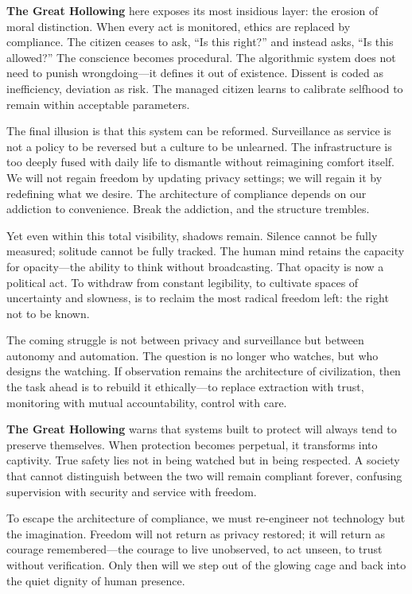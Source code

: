 \documentclass[11pt,twoside]{book}
\begin{document}
\textbf{The Great Hollowing} here exposes its most insidious layer: the erosion of moral distinction.  When every act is monitored, ethics are replaced by compliance.  The citizen ceases to ask, “Is this right?” and instead asks, “Is this allowed?”  The conscience becomes procedural.  The algorithmic system does not need to punish wrongdoing—it defines it out of existence.  Dissent is coded as inefficiency, deviation as risk.  The managed citizen learns to calibrate selfhood to remain within acceptable parameters.

The final illusion is that this system can be reformed.  Surveillance as service is not a policy to be reversed but a culture to be unlearned.  The infrastructure is too deeply fused with daily life to dismantle without reimagining comfort itself.  We will not regain freedom by updating privacy settings; we will regain it by redefining what we desire.  The architecture of compliance depends on our addiction to convenience.  Break the addiction, and the structure trembles.

Yet even within this total visibility, shadows remain.  Silence cannot be fully measured; solitude cannot be fully tracked.  The human mind retains the capacity for opacity—the ability to think without broadcasting.  That opacity is now a political act.  To withdraw from constant legibility, to cultivate spaces of uncertainty and slowness, is to reclaim the most radical freedom left: the right not to be known.

The coming struggle is not between privacy and surveillance but between autonomy and automation.  The question is no longer who watches, but who designs the watching.  If observation remains the architecture of civilization, then the task ahead is to rebuild it ethically—to replace extraction with trust, monitoring with mutual accountability, control with care.

\textbf{The Great Hollowing} warns that systems built to protect will always tend to preserve themselves.  When protection becomes perpetual, it transforms into captivity.  True safety lies not in being watched but in being respected.  A society that cannot distinguish between the two will remain compliant forever, confusing supervision with security and service with freedom.

To escape the architecture of compliance, we must re-engineer not technology but the imagination.  Freedom will not return as privacy restored; it will return as courage remembered—the courage to live unobserved, to act unseen, to trust without verification.  Only then will we step out of the glowing cage and back into the quiet dignity of human presence.
\end{document}
